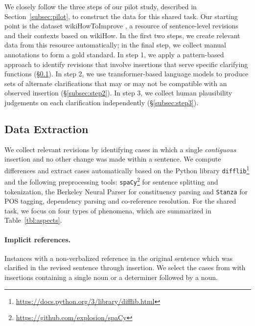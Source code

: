 \documentclass[11pt]{article}
\begin{document}
We closely follow the three steps of our pilot study, described in Section~\ref{subsec:pilot}, to construct the data for this shared task. Our starting point is the dataset wikiHowToImprove \cite{anthonio-etal-2020-wikihowtoimprove}, a resource of sentence-level revisions and their contexts based on wikiHow. %
In the first two steps, we create relevant data from this resource automatically; in the final step, we collect manual annotations to form a gold standard. In step 1, we apply a pattern-based approach to identify revisions that involve insertions that serve specific clarifying functions (\S\ref{subsec:step1}). In step 2, we use transformer-based language models to produce sets of alternate clarifications that may or may not be compatible with an observed insertion (\S\ref{subsec:step2}). In step 3, we collect human plausibility judgements on each clarification independently (\S\ref{subsec:step3}).

\subsection{Data Extraction}
\label{subsec:step1}

We collect relevant revisions by identifying cases in which a single \textit{contiguous} insertion and no other change was made within a sentence. We compute differences and extract cases automatically based on the Python library \texttt{difflib}\footnote{\url{https://docs.python.org/3/library/difflib.html}}
and the following preprocessing tools:
\texttt{spaCy}\footnote{\url{https://github.com/explosion/spaCy}} for sentence splitting and tokenization, the Berkeley Neural Parser \cite{kitaev-klein-2018-constituency}
for constituency parsing and \texttt{Stanza} \cite{qi-etal-2020-stanza} for POS tagging, dependency parsing and co-reference resolution.
For the shared task, we focus on four types of phenomena, which are summarized in Table~\ref{tbl:aspects}.

\paragraph{Implicit references.} Instances with a non-verbalized reference in the original sentence which was clarified in the revised sentence through insertion. We select the cases from  with insertions containing a single noun or a determiner followed by a noun. 
\end{document}

